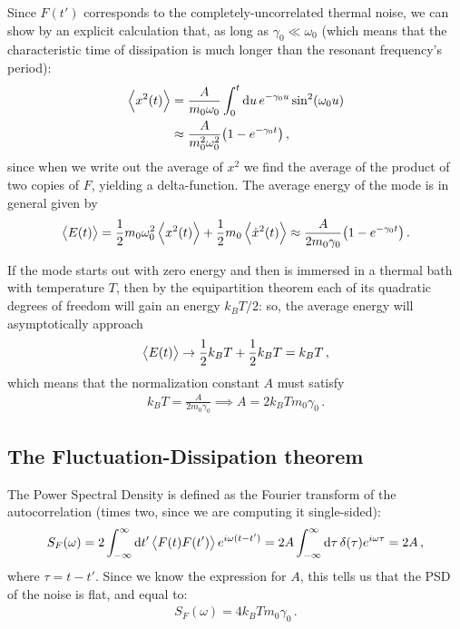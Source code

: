 \documentclass[main.tex]{subfiles}
\begin{document}
Since \(F(t')\) corresponds to the completely-uncorrelated thermal noise, we can show by an explicit calculation that, as long as \(\gamma_0 \ll \omega_0 \) (which means that the characteristic time of dissipation is much longer than the resonant frequency's period):
%
\begin{align}
\expval{x^2(t)} &= \frac{A}{m_0 \omega_0 } \int_{0}^{t} \dd{u} e^{-\gamma_0 u} \sin^2(\omega_0 u) \\
&\approx \frac{A}{m_0^2 \omega_0^2} \qty(1 - e^{- \gamma_0 t})
\,,
\end{align}
%
since when we write out the average of \(x^2\) we find the average of the product of two copies of \(F\), yielding a delta-function.
The average energy of the mode is in general given by 
%
\begin{align}
\expval{E(t)} 
= \frac{1}{2} m_0 \omega_0^2 \expval{x^2(t)} + \frac{1}{2} m_0 \expval{\dot{x}^2(t)}
\approx \frac{A}{2 m_0 \gamma_0 } \qty(1 - e^{-\gamma_0 t})
\,.
\end{align}

If the mode starts out with zero energy and then is immersed in a thermal bath with temperature \(T\), then by the equipartition theorem each of its quadratic degrees of freedom will gain an energy \(k_B T /2\): so, the average energy will asymptotically approach
%
\begin{align}
\expval{E(t)} \to \frac{1}{2} k_B T + \frac{1}{2} k_B T = k_B T 
\,,
\end{align}
%
which means that the normalization constant \(A\) must satisfy 
%
\begin{align}
k_B T = \frac{A}{2 m_0 \gamma_0 } \implies A = 2 k_B T m_0 \gamma_0 
\,.
\end{align}
%

\subsection{The Fluctuation-Dissipation theorem}

The Power Spectral Density is defined as the Fourier transform of the autocorrelation (times two, since we are computing it single-sided): 
%
\begin{align}
S_F(\omega ) = 2 \int_{-\infty}^{\infty} \dd{t'} \expval{F(t) F(t')} e^{i \omega (t - t')} = 2 A \int_{-\infty}^{\infty} \dd{\tau } \delta(\tau ) e^{i \omega \tau } = 2A 
\,,
\end{align}
%
where \(\tau  = t - t'\). Since we know the expression for \(A\), this tells us that the PSD of the noise is flat, and equal to: 
%
\begin{align}
S_F(\omega ) = 4 k_B T m_0 \gamma_0 
\,.
\end{align}
\end{document}
